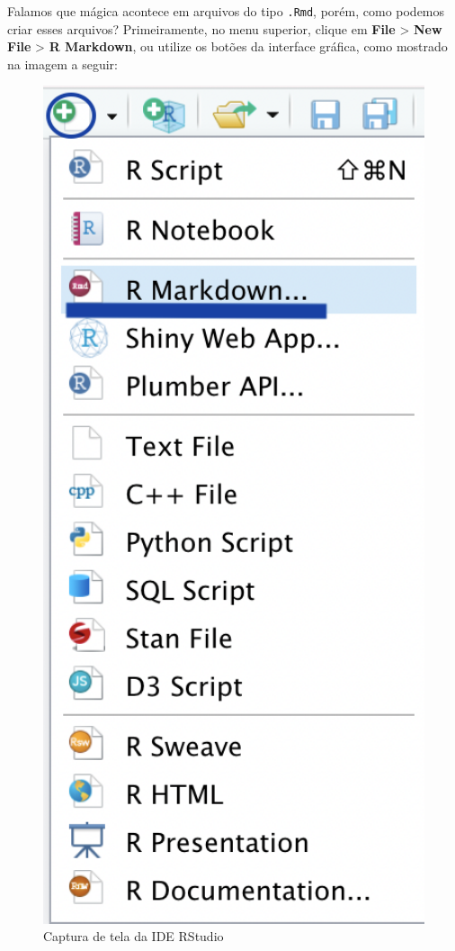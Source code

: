 \documentclass[
]{book}
\begin{document}
Falamos que mágica acontece em arquivos do tipo \texttt{.Rmd}, porém, como podemos criar esses arquivos? Primeiramente, no menu superior, clique em \textbf{File} \textgreater{} \textbf{New File} \textgreater{} \textbf{R Markdown}, ou utilize os botões da interface gráfica, como mostrado na imagem a seguir:

\begin{figure}

{\centering \includegraphics[width=5.31in]{assets/img/relatorios/criar-rmd} 

}

\caption{Captura de tela da IDE RStudio}\label{fig:unnamed-chunk-1}
\end{figure}
\end{document}
